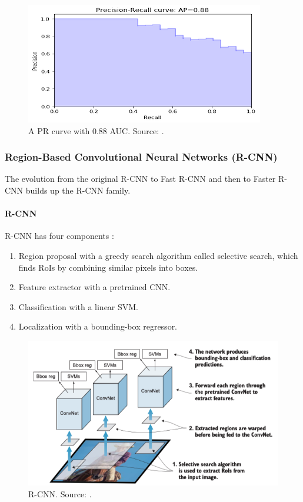 \documentclass[a4paper,11pt,oneside]{article}
\begin{document}
  \begin{figure}[ht]
    \begin{center}
      \includegraphics[width=.8\textwidth]{pr_curve.png}
    \end{center}
    \caption{A PR curve with 0.88 AUC. Source: \cite{planche2019hands}.}
  \end{figure}

  \subsubsection{Region-Based Convolutional Neural Networks (R-CNN)}

  The evolution from the original R-CNN \cite{girshick2014rich} to Fast R-CNN \cite{girshick2015fast} and then to
  Faster R-CNN \cite{ren2015faster} builds up the R-CNN family.

  \paragraph{R-CNN}

  R-CNN has four components \cite{elgendy2020deep, girshick2014rich}:

  \begin{enumerate}
    \item Region proposal with a greedy search algorithm called selective search, which finds RoIs by combining similar
    pixels into boxes.
    \item Feature extractor with a pretrained CNN.
    \item Classification with a linear SVM.
    \item Localization with a bounding-box regressor.
  \end{enumerate}

  \begin{figure}[ht]
    \begin{center}
      \includegraphics[width=.8\textwidth]{r_cnn.png}
    \end{center}
    \caption{R-CNN. Source: \cite{elgendy2020deep}.}
  \end{figure}
\end{document}
